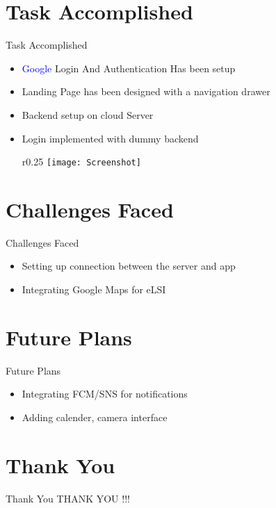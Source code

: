 \documentclass[10pt, a4paper]{beamer}
\begin{document}
\section{Task Accomplished}
\begin{frame}{Task Accomplished}
	\begin{itemize}
		\item \textcolor{blue}{Google} Login And Authentication Has been setup
		 \item Landing Page has been designed with a navigation drawer
		\item Backend setup on cloud Server
		\item Login implemented with dummy backend
\begin{wrapfigure}{r}{0.25\textwidth}
    \centering
    \texttt{[image: Screenshot]}
\end{wrapfigure}

		
		
	\end{itemize}
\end{frame}

\section{Challenges Faced}
\begin{frame}{Challenges Faced}
	\begin{itemize}
		\item Setting up connection between the server and app 
		\item Integrating Google Maps for eLSI
	\end{itemize}
\end{frame}

\section{Future Plans}
\begin{frame}{Future Plans}
	\begin{itemize}
		\item  Integrating FCM/SNS for notifications
		\item Adding calender, camera interface
	\end{itemize}
\end{frame}


\section{Thank You}
\begin{frame}{Thank You}
	\centering THANK YOU !!!
\end{frame}
\end{document}
